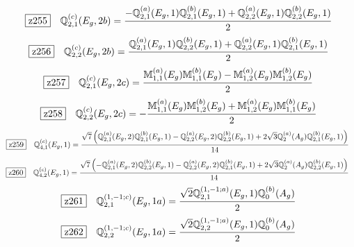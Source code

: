 \documentclass[fleqn,10pt,landscape]{jsarticle}
\begin{document}
\begin{dmath*}
\hspace*{3mm}\fbox{z255}\quad \mathbb{Q}_{2,1}^{(c)}(E_{g},2b)=\frac{- \mathbb{Q}_{2,1}^{(a)}(E_{g},1) \mathbb{Q}_{2,1}^{(b)}(E_{g},1) + \mathbb{Q}_{2,2}^{(a)}(E_{g},1) \mathbb{Q}_{2,2}^{(b)}(E_{g},1)}{2}
\end{dmath*}
\begin{dmath*}
\hspace*{3mm}\fbox{z256}\quad \mathbb{Q}_{2,2}^{(c)}(E_{g},2b)=\frac{\mathbb{Q}_{2,1}^{(a)}(E_{g},1) \mathbb{Q}_{2,2}^{(b)}(E_{g},1) + \mathbb{Q}_{2,2}^{(a)}(E_{g},1) \mathbb{Q}_{2,1}^{(b)}(E_{g},1)}{2}
\end{dmath*}
\begin{dmath*}
\hspace*{3mm}\fbox{z257}\quad \mathbb{Q}_{2,1}^{(c)}(E_{g},2c)=\frac{\mathbb{M}_{1,1}^{(a)}(E_{g}) \mathbb{M}_{1,1}^{(b)}(E_{g}) - \mathbb{M}_{1,2}^{(a)}(E_{g}) \mathbb{M}_{1,2}^{(b)}(E_{g})}{2}
\end{dmath*}
\begin{dmath*}
\hspace*{3mm}\fbox{z258}\quad \mathbb{Q}_{2,2}^{(c)}(E_{g},2c)=- \frac{\mathbb{M}_{1,1}^{(a)}(E_{g}) \mathbb{M}_{1,2}^{(b)}(E_{g}) + \mathbb{M}_{1,2}^{(a)}(E_{g}) \mathbb{M}_{1,1}^{(b)}(E_{g})}{2}
\end{dmath*}
\begin{dmath*}
\hspace*{3mm}\fbox{z259}\quad \mathbb{Q}_{4,1}^{(c)}(E_{g},1)=\frac{\sqrt{7} \left(\mathbb{Q}_{2,1}^{(a)}(E_{g},2) \mathbb{Q}_{2,1}^{(b)}(E_{g},1) - \mathbb{Q}_{2,2}^{(a)}(E_{g},2) \mathbb{Q}_{2,2}^{(b)}(E_{g},1) + 2 \sqrt{3} \mathbb{Q}_{2}^{(a)}(A_{g}) \mathbb{Q}_{2,1}^{(b)}(E_{g},1)\right)}{14}
\end{dmath*}
\begin{dmath*}
\hspace*{3mm}\fbox{z260}\quad \mathbb{Q}_{4,2}^{(c)}(E_{g},1)=\frac{\sqrt{7} \left(- \mathbb{Q}_{2,1}^{(a)}(E_{g},2) \mathbb{Q}_{2,2}^{(b)}(E_{g},1) - \mathbb{Q}_{2,2}^{(a)}(E_{g},2) \mathbb{Q}_{2,1}^{(b)}(E_{g},1) + 2 \sqrt{3} \mathbb{Q}_{2}^{(a)}(A_{g}) \mathbb{Q}_{2,2}^{(b)}(E_{g},1)\right)}{14}
\end{dmath*}
\begin{dmath*}
\hspace*{3mm}\fbox{z261}\quad \mathbb{Q}_{2,1}^{(1,-1;c)}(E_{g},1a)=\frac{\sqrt{2} \mathbb{Q}_{2,1}^{(1,-1;a)}(E_{g},1) \mathbb{Q}_{0}^{(b)}(A_{g})}{2}
\end{dmath*}
\begin{dmath*}
\hspace*{3mm}\fbox{z262}\quad \mathbb{Q}_{2,2}^{(1,-1;c)}(E_{g},1a)=\frac{\sqrt{2} \mathbb{Q}_{2,2}^{(1,-1;a)}(E_{g},1) \mathbb{Q}_{0}^{(b)}(A_{g})}{2}
\end{dmath*}
\end{document}
